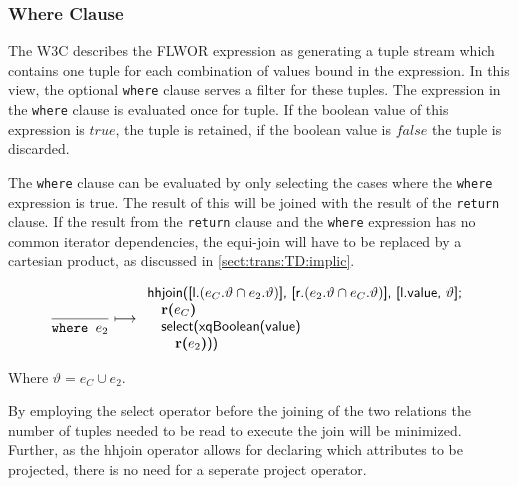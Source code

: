 \subsubsection{Where Clause}
The W3C describes the FLWOR expression as generating a tuple stream which contains one tuple for each combination
of values bound in the expression\cite{w3c00}. In this view, the optional \texttt{where} clause serves a filter for
these tuples. The expression in the \texttt{where} clause is evaluated once for tuple. If the boolean value of this
expression is $true$, the tuple is retained, if the boolean value is $false$ the tuple is discarded.

The \texttt{where} clause can be evaluated by only selecting the cases where the \texttt{where} expression is true.
The result of this will be joined with the result of the \texttt{return} clause. If the result from the
\texttt{return} clause and the \texttt{where} expression has no common iterator dependencies, the equi-join will
have to be replaced by a cartesian product, as discussed in \ref{sect:trans:TD:implic}.

\begin{equation}
\frac{}{\mbox{\texttt{where }}e_2}\longmapsto
\begin{array}{l}
\mbox{\textsf{hhjoin([l.}}(e_{C}.\vartheta \cap e_2.\vartheta)\mbox{\textsf{], [r.}}(e_{2}.\vartheta \cap
e_{C}.\vartheta)\mbox{\textsf{], [l.value, }} \vartheta\mbox{\textsf{];}} \\ \quad
\mbox{\textbf{r(}}e_{C}\mbox{\textbf{)}} \\ \quad
\mbox{\textsf{select(xqBoolean(value)}} \\ \quad \quad
\mbox{\textbf{r(}}e_{2}\mbox{\textbf{)}\textsf{))}}
\end{array}
\label{rule:trans:TD:where}
\end{equation}

Where $\vartheta = e_{C} \cup e_{2}$.

By employing the \textsf{select} operator before the joining of the two relations the number of tuples needed to
be read to execute the join will be minimized. Further, as the \textsf{hhjoin} operator allows for declaring which
attributes to be projected, there is no need for a seperate \textsf{project} operator.


